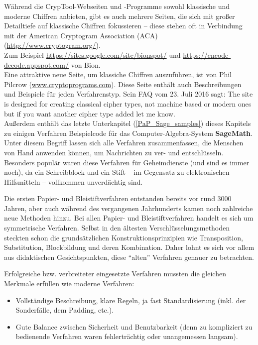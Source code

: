 \begin{refsegment}
{Während die CrypTool-Webseiten und -Programme sowohl klassische und moderne Chiffren
anbieten, gibt es auch mehrere Seiten, die sich mit großer Detailtiefe auf klassische
Chiffren fokussieren -- diese stehen oft in Verbindung mit der American Cryptogram
Association (ACA) (\url{http://www.cryptogram.org/}).\\
Zum Beispiel \url{https://sites.google.com/site/bionspot/} und
\url{https://encode-decode.appspot.com/} von Bion.\\
Eine attraktive neue Seite, um klassiche Chiffren auszuführen, ist von
Phil Pilcrow (\url{www.cryptoprograms.com}). Diese Seite enthält auch Beschreibungen
und Beispiele für jeden Verfahrenstyp. Sein FAQ vom 23. Juli 2016 sagt:
\glqq The site is designed for creating classical cipher types, not machine based
or modern ones but if you want another cipher type added let me know.\grqq {}\\

Außerdem enthält das letzte Unterkapitel (\ref{PaP_Sage_samples}) dieses Kapitels
zu einigen Verfahren Beispielcode für das Computer-Algebra-System {\bf SageMath}.
   }
Unter diesem Begriff lassen sich alle Verfahren zusammenfassen, die Menschen von
Hand anwenden können, um Nachrichten zu ver- und entschlüsseln.
Besonders populär waren diese Verfahren für Geheimdienste (und
sind es immer noch), da ein Schreibblock und ein Stift -- im
Gegensatz zu elektronischen Hilfsmitteln -- vollkommen unverdächtig sind.

Die ersten Papier- und Bleistiftverfahren entstanden bereits vor rund
3000 Jahren, aber auch während des vergangenen Jahrhunderts kamen
noch zahlreiche neue Methoden hinzu. Bei allen Papier- und
Bleistiftverfahren handelt es sich um symmetrische
Verfahren. Selbst in den
ältesten Verschlüsselungsmethoden steckten schon die
grundsätzlichen Konstruktionsprinzipien wie Transposition,
Substitution, Blockbildung und deren Kombination. Daher
lohnt es sich vor allem aus didaktischen Gesichtspunkten,
diese "`alten"' Verfahren genauer zu betrachten.

Erfolgreiche bzw. verbreiteter eingesetzte Verfahren mussten die gleichen
Merkmale erfüllen wie moderne Verfahren:
\begin{itemize}
\item Vollständige Beschreibung, klare Regeln, ja fast Standardisierung
      (inkl. der Sonderfälle, dem Padding, etc.).
\item Gute Balance zwischen Sicherheit und Benutzbarkeit
      (denn zu kompliziert zu bedienende Verfahren waren fehlerträchtig
      oder unangemessen langsam).
\end{itemize}




\end{refsegment}
